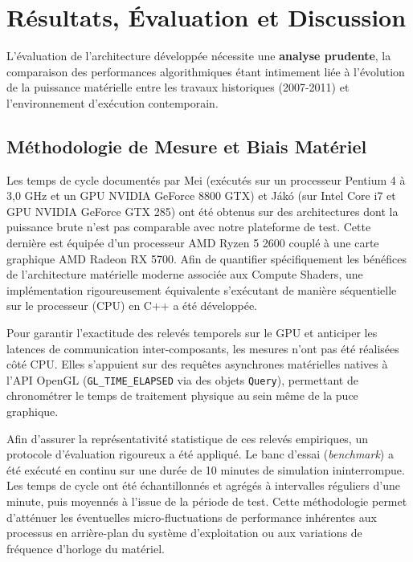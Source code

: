 \documentclass[10pt,twocolumn,a4paper]{article}
\begin{document}
\newpage
\section{Résultats, Évaluation et Discussion}\label{sec:resultats}

L'évaluation de l'architecture développée nécessite une \textbf{analyse prudente}, la comparaison des performances algorithmiques étant intimement liée à l'évolution de la puissance matérielle entre les travaux historiques (2007-2011) et l'environnement d'exécution contemporain.

\subsection{Méthodologie de Mesure et Biais Matériel}\label{subsec:methodo_mesure}
Les temps de cycle documentés par Mei \cite{MDH07} (exécutés sur un processeur Pentium 4 à 3,0 GHz et un GPU NVIDIA GeForce 8800 GTX) et Jákó \cite{Jako11} (sur Intel Core i7 et GPU NVIDIA GeForce GTX 285) ont été obtenus sur des architectures dont la puissance brute n'est pas comparable avec notre plateforme de test. Cette dernière est équipée d'un processeur AMD Ryzen 5 2600 couplé à une carte graphique AMD Radeon RX 5700. Afin de quantifier spécifiquement les bénéfices de l'architecture matérielle moderne associée aux Compute Shaders, une implémentation rigoureusement équivalente s'exécutant de manière séquentielle sur le processeur (CPU) en C++ a été développée.

Pour garantir l'exactitude des relevés temporels sur le GPU et anticiper les latences de communication inter-composants, les mesures n'ont pas été réalisées côté CPU. Elles s'appuient sur des requêtes asynchrones matérielles natives à l'API OpenGL (\texttt{GL\_TIME\_ELAPSED} via des objets \texttt{Query}), permettant de chronométrer le temps de traitement physique au sein même de la puce graphique.

Afin d'assurer la représentativité statistique de ces relevés empiriques, un protocole d'évaluation rigoureux a été appliqué. Le banc d'essai (\textit{benchmark}) a été exécuté en continu sur une durée de 10 minutes de simulation ininterrompue. Les temps de cycle ont été échantillonnés et agrégés à intervalles réguliers d'une minute, puis moyennés à l'issue de la période de test. Cette méthodologie permet d'atténuer les éventuelles micro-fluctuations de performance inhérentes aux processus en arrière-plan du système d'exploitation ou aux variations de fréquence d'horloge du matériel.
\end{document}
